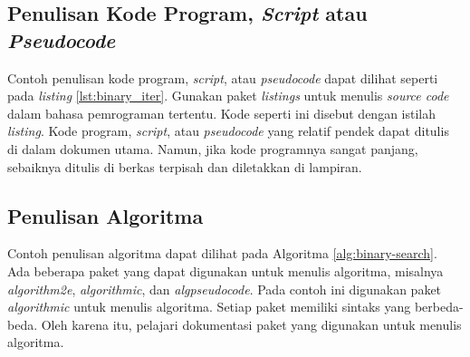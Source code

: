 \subsection{Penulisan Kode Program, \textit{Script} atau \textit{Pseudocode}}
Contoh penulisan kode program, \textit{script}, atau \textit{pseudocode} dapat dilihat seperti pada \textit{listing} \ref{lst:binary_iter}. 
Gunakan paket \textit{listings} untuk menulis \textit{source code} dalam bahasa pemrograman tertentu. 
Kode seperti ini disebut dengan istilah \textit{listing}. 
Kode program, \textit{script}, atau \textit{pseudocode} yang relatif pendek dapat ditulis di dalam
dokumen utama. Namun, jika kode programnya sangat panjang, sebaiknya ditulis di berkas terpisah dan diletakkan di lampiran.

\subsection{Penulisan Algoritma}
Contoh penulisan algoritma dapat dilihat pada Algoritma \ref{alg:binary-search}. Ada beberapa paket yang dapat digunakan untuk menulis algoritma,
misalnya \textit{algorithm2e}, \textit{algorithmic}, dan \textit{algpseudocode}. 
Pada contoh ini digunakan paket \textit{algorithmic} untuk menulis algoritma. Setiap paket memiliki sintaks yang berbeda-beda.
Oleh karena itu, pelajari dokumentasi paket yang digunakan untuk menulis algoritma.









